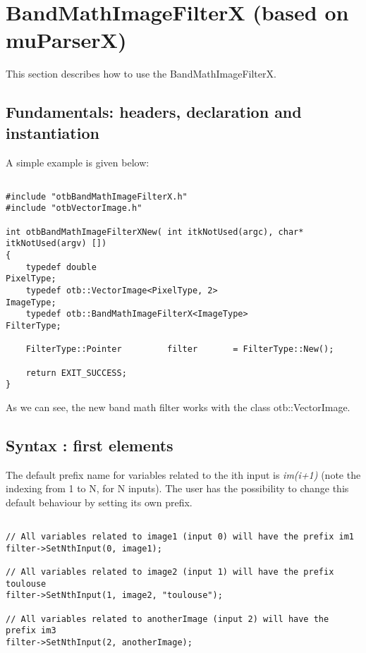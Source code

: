 \newpage
\section{BandMathImageFilterX (based on muParserX)}\label{sec:bandmathx}
This section describes how to use the BandMathImageFilterX.


\subsection{Fundamentals: headers, declaration and instantiation}\label{ssec:fund}

A simple example is given below:

\begin{verbatim}

#include "otbBandMathImageFilterX.h"
#include "otbVectorImage.h"

int otbBandMathImageFilterXNew( int itkNotUsed(argc), char* itkNotUsed(argv) [])
{
  	typedef double                                            			PixelType;
  	typedef otb::VectorImage<PixelType, 2>                     	ImageType;
  	typedef otb::BandMathImageFilterX<ImageType>                FilterType;

   	FilterType::Pointer         filter       = FilterType::New();

   	return EXIT_SUCCESS;
}

\end{verbatim}

As we can see, the new band math filter works with the class otb::VectorImage.

\subsection{Syntax : first elements}\label{ssec:syntax}

The default prefix name for variables related to the ith input is \textit{im(i+1)} 
(note the indexing from 1 to N, for N inputs). The user has the 
possibility to change this default behaviour by setting its own prefix.

\begin{verbatim}

// All variables related to image1 (input 0) will have the prefix im1 
filter->SetNthInput(0, image1);   		

// All variables related to image2 (input 1) will have the prefix  toulouse   
filter->SetNthInput(1, image2, "toulouse");   

// All variables related to anotherImage (input 2) will have the prefix im3
filter->SetNthInput(2, anotherImage); 	   

\end{verbatim}

